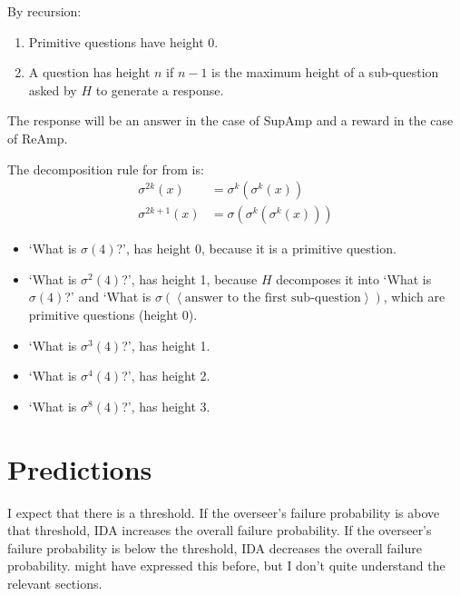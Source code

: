 \documentclass{farlamp}
\begin{document}
\begin{definition} By recursion:
    \begin{enumerate}
    \item Primitive questions have height 0.
    \item A question has height $n$ if $n-1$ is the maximum height of a
        sub-question asked by $H$ to generate a response.
    \end{enumerate}
The response will be an answer in the case of SupAmp and a reward in the case of
ReAmp.
\end{definition}

\begin{example}
    The decomposition rule for  from \textcite[table
    3]{CSASupAmp} is:
    \begin{align}
        \sigma^{2k}(x) &= \sigma^k(\sigma^k(x)) \\
        \sigma^{2k+1}(x) &= \sigma(\sigma^k(\sigma^k(x)))
    \end{align}

    \begin{itemize}
        \item ‘What is $\sigma(4)$?’, has height 0, because it is a primitive
            question.
        \item ‘What is $\sigma^2(4)$?’, has height 1, because $H$ decomposes it
            into ‘What is $\sigma(4)$?’ and ‘What is $\sigma(\left<\text{answer
            to the first sub-question}\right>)$, which are primitive questions
            (height 0).
        \item ‘What is $\sigma^3(4)$?’, has height 1.
        \item ‘What is $\sigma^4(4)$?’, has height 2.
        \item ‘What is $\sigma^8(4)$?’, has height 3.
    \end{itemize}
\end{example}


\section{Predictions}
\label{sec:prediction}

I expect that there is a threshold. If the overseer's failure probability is
above that threshold, IDA increases the overall failure probability. If the
overseer's failure probability is below the threshold, IDA decreases the overall
failure probability. \textcite{ChriRelAmp} might have expressed this before, but
I don't quite understand the relevant sections.
\end{document}

